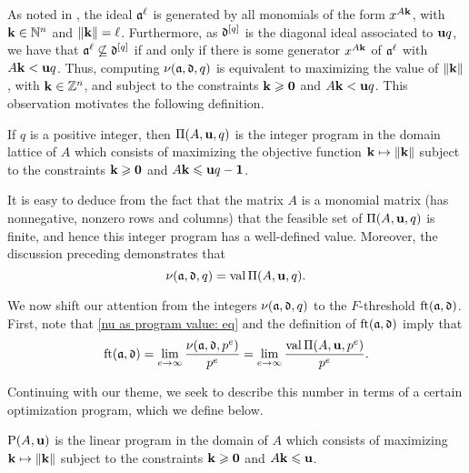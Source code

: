 \documentclass{amsart}
\begin{document}
As noted in ,  the ideal $\mathfrak{a}^{\ell}$ is generated by all monomials of the form $x^{A\mathbf{k}}$, with $\mathbf{k}\in \mathbb{N}^n$ and $\| \mathbf{k} \| = \ell$.  Furthermore, as $\mathfrak{d}^{[q]}$ is the diagonal ideal associated to $\mathbf{u}q$, we have that $\mathfrak{a}^{\ell} \not\subseteq \mathfrak{d}^{[q]}$ if and only if there is some generator $x^{A \mathbf{k}}$ of $\mathfrak{a}^{\ell}$ with $A\mathbf{k} < \mathbf{u}q$.  Thus, computing $\nu(\mathfrak{a},\mathfrak{d},q)$ is equivalent to maximizing the value of $\| \mathbf{k} \|$, with $\mathbf{k} \in \mathbb{Z}^n$, and subject to the constraints $\mathbf{k} \geqslant \mathbf{0}$ and $A\mathbf{k} < \mathbf{u}q$.
This observation motivates the following definition.

\begin{definition}
\label{IP: D}
   If $q$ is a positive integer, then $\Pi(A, \mathbf{u}, q)$ is the integer program in the domain lattice of $A$ which consists of maximizing the objective function $\mathbf{k} \mapsto \| \mathbf{k} \|$ subject to the constraints $\mathbf{k} \geqslant \mathbf{0}$ and $A \mathbf{k} \leqslant \mathbf{u}q - \mathbf{1}$.
\end{definition}

It is easy to deduce from the fact that the matrix $A$ is a monomial matrix (\ie has nonnegative, nonzero rows and columns) that the feasible set of $\Pi(A,\mathbf{u},q)$ is finite, and hence this integer program has a well-defined value.
Moreover, the discussion preceding  demonstrates that
\begin{equation}
\label{nu as program value: eq}
\nu(\mathfrak{a},\mathfrak{d},q) = \operatorname{val} \Pi(A,\mathbf{u},q).
\end{equation}

We now shift our attention from the integers $\nu(\mathfrak{a}, \mathfrak{d}, q)$ to the $F$-threshold $\operatorname{ft}(\mathfrak{a}, \mathfrak{d})$.  First, note that \eqref{nu as program value: eq} and the definition of $\operatorname{ft}(\mathfrak{a}, \mathfrak{d})$ imply that
\begin{equation}
\label{ft as limit of normalized program values: eq}
\operatorname{ft}(\mathfrak{a}, \mathfrak{d}) = \lim_{e\to\infty} \frac{\nu(\mathfrak{a},\mathfrak{d},p^e)}{p^e} = \lim_{e\to\infty} \frac{\operatorname{val} \Pi(A,\mathbf{u},p^e)}{p^e}.
\end{equation}

Continuing with our theme, we seek to describe this number in terms of a certain optimization program, which we define below.

\begin{definition}
\label{LP: D}
 $\mathrm{P}(A, \mathbf{u})$ is the linear program in the domain of $A$ which consists of maximizing $\mathbf{k} \mapsto \| \mathbf{k} \|$ subject to the constraints $\mathbf{k} \geqslant \mathbf{0}$ and $A \mathbf{k} \leqslant \mathbf{u}$.
\end{definition}
\end{document}

